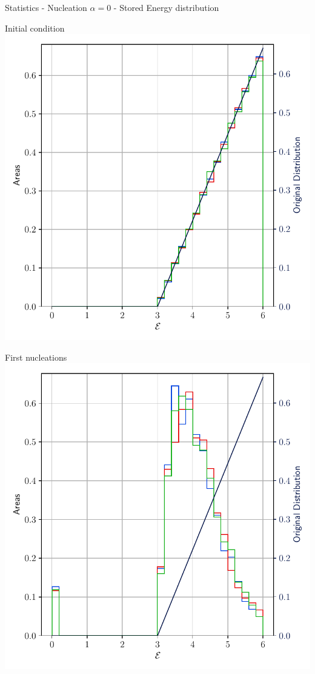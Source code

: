 \documentclass[usenames,dvipsnames]{beamer}
\begin{document}
\begin{frame}{Statistics - Nucleation $\alpha = 0$  - Stored Energy distribution}
\small
    \begin{minipage}{0.5\textwidth}
    \centering
    \scriptsize
    Initial condition
    \includegraphics[trim={0 1em 0 1.1em},clip=true,scale=0.35]{figures/stored_energy/SE/se/000000_nuclconstant_set.pdf}
    \end{minipage}%
    \begin{minipage}{0.5\textwidth}
    \centering
    \scriptsize
    First nucleations
    \includegraphics[trim={0 1em 0 1.1em},clip=true,scale=0.35]{figures/stored_energy/SE/se/000070_nuclconstant_set.pdf}

\end{minipage}
\end{frame}
\end{document}
